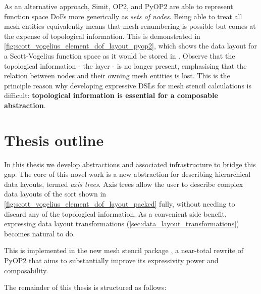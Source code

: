 \documentclass[thesis]{subfiles}
\begin{document}
As an alternative approach, Simit, OP2, and PyOP2 are able to represent function space DoFs more generically as \textit{sets of nodes}.
Being able to treat all mesh entities equivalently means that mesh renumbering is possible but comes at the expense of topological information.
This is demonstrated in \cref{fig:scott_vogelius_element_dof_layout_pyop2}, which shows the data layout for a Scott-Vogelius function space as it would be stored in .
Observe that the topological information - the  layer - is no longer present, emphasising that the relation between nodes and their owning mesh entities is lost.
This is the principle reason why developing expressive DSLs for mesh stencil calculations is difficult: \textbf{topological information is essential for a composable abstraction}.


\section{Thesis outline}

In this thesis we develop abstractions and associated infrastructure to bridge this gap.
The core of this novel work is a new abstraction for describing hierarchical data layouts, termed \textit{axis trees}.
Axis trees allow the user to describe complex data layouts of the sort shown in \cref{fig:scott_vogelius_element_dof_layout_packed} fully, without needing to discard any of the topological information.
As a convenient side benefit, expressing data layout transformations (\cref{sec:data_layout_transformations}) becomes natural to do.

This is implemented in the new mesh stencil package , a near-total rewrite of PyOP2 that aims to substantially improve its expressivity power and composability.

The remainder of this thesis is structured as follows:

\end{document}
